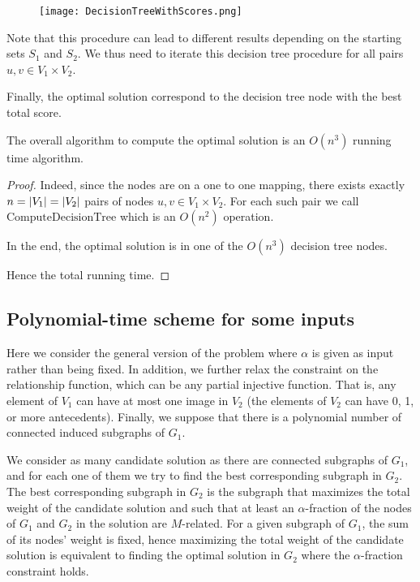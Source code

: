 			\begin{figure}[ht]
				\centering
				\texttt{[image: DecisionTreeWithScores.png]}
				\label{fig:foo}
			\end{figure}

			Note that this procedure can lead to different results depending on the starting sets $S_1$ and $S_2$.
			We thus need to iterate this decision tree procedure for all pairs $u,v \in V_1\times V_2$.

			Finally, the optimal solution correspond to the decision tree node with the best total score.

			\begin{proposition}\label{prop:totalComplex}
				The overall algorithm to compute the optimal solution is an $O(n^3)$ running time algorithm.
			\end{proposition}
			\begin{proof}
				Indeed, since the nodes are on a one to one mapping, there exists exactly $n = \lvert V_1\rvert = \lvert V_2\rvert$ pairs of nodes $u,v \in V_1\times V_2$.
				For each such pair we call $\text{ComputeDecisionTree}$ which is an $O(n^2)$ operation.

				In the end, the optimal solution is in one of the $O(n^3)$ decision tree nodes.

				Hence the total running time.
			\end{proof}

		\subsection{Polynomial-time scheme for some inputs}
		\label{subsec:enumerable}

			Here we consider the general version of the \mwccs{} problem where $\alpha$ is given as input rather than being fixed.
			In addition, we further relax the constraint on the relationship function, which can be any partial injective function.
			That is, any element of $V_1$ can have at most one image in $V_2$ (the elements of $V_2$ can have 0, 1, or more antecedents).
			Finally, we suppose that there is a polynomial number of connected induced subgraphs of $G_1$.

			We consider as many candidate solution as there are connected subgraphs of $G_1$, and for each one of them we try to find the best corresponding subgraph in $G_2$.
			The best corresponding subgraph in $G_2$ is the subgraph that maximizes the total weight of the candidate solution and such that at least an $\alpha$-fraction of the nodes of $G_1$ and $G_2$ in the solution are $M$-related.
			For a given subgraph of $G_1$, the sum of its nodes' weight is fixed, hence maximizing the total weight of the candidate solution is equivalent to finding the optimal solution in $G_2$ where the $\alpha$-fraction constraint holds.

